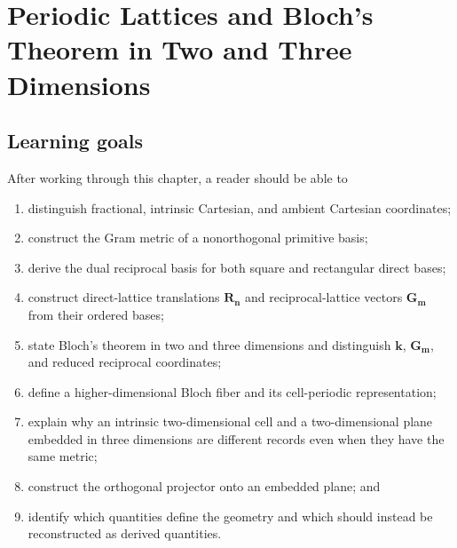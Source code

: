 \chapter{Periodic Lattices and Bloch's Theorem in Two and Three Dimensions}

\label{ch:training-periodic-geometry}


\section{Learning goals}

After working through this chapter, a reader should be able to

\begin{enumerate}
  \item distinguish fractional, intrinsic Cartesian, and ambient Cartesian
        coordinates;
  \item construct the Gram metric of a nonorthogonal primitive basis;
  \item derive the dual reciprocal basis for both square and rectangular direct
        bases;
  \item construct direct-lattice translations $\mathbf R_{\mathbf n}$ and
        reciprocal-lattice vectors $\mathbf G_{\mathbf m}$ from their ordered
        bases;
  \item state Bloch's theorem in two and three dimensions and distinguish
        $\mathbf k$, $\mathbf G_{\mathbf m}$, and reduced reciprocal
        coordinates;
  \item define a higher-dimensional Bloch fiber and its cell-periodic
        representation;
  \item explain why an intrinsic two-dimensional cell and a two-dimensional
        plane embedded in three dimensions are different records even when they
        have the same metric;
  \item construct the orthogonal projector onto an embedded plane; and
  \item identify which quantities define the geometry and which should instead
        be reconstructed as derived quantities.
\end{enumerate}

